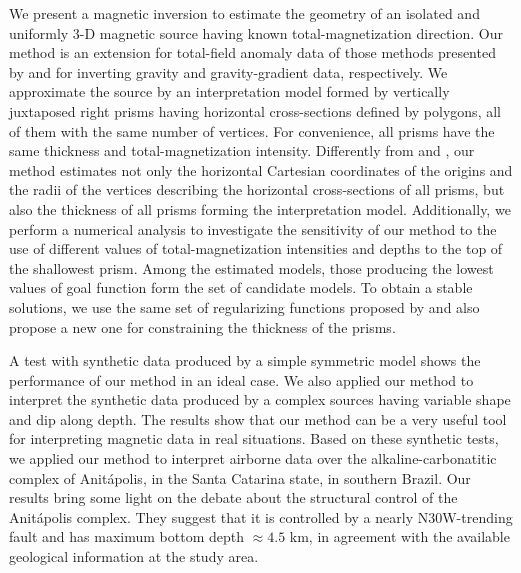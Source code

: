 We present a magnetic inversion to estimate the geometry of an isolated 
and uniformly 3-D magnetic source having known total-magnetization direction.
Our method is an extension for total-field anomaly data of those methods presented 
by \cite{oliveirajr-etal2011} and \cite{oliveirajr-barbosa2013} for inverting 
gravity and gravity-gradient data, respectively. 
We approximate the source by an interpretation model formed by vertically juxtaposed 
right prisms having horizontal cross-sections defined by polygons, all
of them with the same number of vertices.
For convenience, all prisms have the same thickness and total-magnetization 
intensity.
Differently from \cite{oliveirajr-etal2011} and \cite{oliveirajr-barbosa2013}, 
our method estimates not only the horizontal Cartesian coordinates of the origins and the radii of the vertices describing the horizontal cross-sections of all prisms, but also the thickness of all 
prisms forming the interpretation model. Additionally, we perform a numerical analysis to investigate the sensitivity of our method to the use of different values of total-magnetization intensities and depths to the top 
of the shallowest prism. Among the estimated models, those producing the 
lowest values of goal function form the set of candidate models.
To obtain a stable solutions, we use the same set of regularizing functions proposed by 
\cite{oliveirajr-etal2011} and also propose a new one for constraining the 
thickness of the prisms. 

A test with synthetic data produced by a simple symmetric model shows the performance 
of our method in an ideal case. We also applied our method to interpret the synthetic 
data produced by a complex sources having variable shape and dip along depth. The 
results show that our method can be a very useful tool for interpreting magnetic data 
in real situations. Based on these synthetic tests, we applied our method 
to interpret airborne data over the alkaline-carbonatitic complex of 
Anit{\'a}polis, in the Santa Catarina state, in southern Brazil. 
Our results bring some light on the debate about the structural control of the 
Anit{\'a}polis complex. 
They suggest that it is controlled by a nearly N30W-trending fault
and has maximum bottom depth $\approx 4.5 $ km, in agreement with the available 
geological information at the study area.